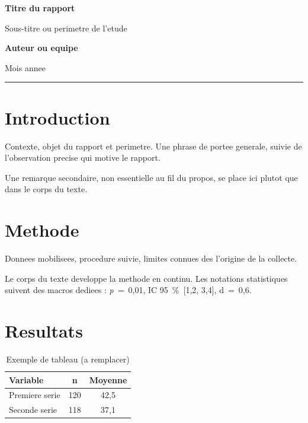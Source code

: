 \documentclass[11pt,a4paper]{article}
\newcommand{\pvalue}[1]{\textit{p}~=~#1}
\newcommand{\CI}[2]{IC 95~\%~[#1, #2]}
\newcommand{\effectsize}[2]{#1~=~#2}
\newcommand{\pagetitre}[4]{%
  \begin{titlepage}
  \centering
  \vspace*{2.5cm}
  {\Huge\bfseries\color{ScriptoriumEncre} #1\par}
  \vspace{0.5cm}
  {\Large\color{ScriptoriumTrait} #2\par}
  \vspace{3cm}
  {\large\bfseries #3\par}
  \vspace{0.3cm}
  {\large #4\par}
  \vfill
  \textcolor{ScriptoriumAccent}{\rule{\textwidth}{2pt}}
  \end{titlepage}
}
\begin{document}
\pagetitre{Titre du rapport}{Sous-titre ou perimetre de l'etude}{Auteur ou equipe}{Mois annee}

\tableofcontents
\thispagestyle{empty}
\newpage

\listoffigures
\listoftables
\thispagestyle{empty}
\newpage

\section{Introduction}

Contexte, objet du rapport et perimetre. Une phrase de portee generale, suivie de
l'observation precise qui motive le rapport.

\begin{note}
Une remarque secondaire, non essentielle au fil du propos, se place ici plutot que dans
le corps du texte.
\end{note}

\section{Methode}

\begin{methode}
Donnees mobilisees, procedure suivie, limites connues des l'origine de la collecte.
\end{methode}

Le corps du texte developpe la methode en continu. Les notations statistiques suivent des
macros dediees : \pvalue{0{,}01}, \CI{1,2}{3,4}, \effectsize{d}{0{,}6}.

\section{Resultats}

\begin{table}[htbp]
\centering
\caption{Exemple de tableau (a remplacer)}
\label{tab:exemple}
\begin{tabular}{@{}lcc@{}}
\toprule
Variable & n & Moyenne \\
\midrule
Premiere serie & 120 & 42,5 \\
Seconde serie  & 118 & 37,1 \\
\bottomrule
\end{tabular}
\end{table}
\end{document}
